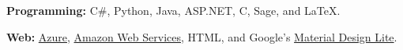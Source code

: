 \documentclass[11pt, letterpaper]{awesome-cv}
\begin{document}

\begin{cvparagraph}
\textbf{Programming:} C\#, Python, Java, ASP.NET, C, Sage, and \LaTeX.

\textbf{Web:} \href{https://azure.microsoft.com/}{Azure}, \href{https://aws.amazon.com/}{Amazon Web Services}, HTML, and Google's \href{https://getmdl.io/}{Material Design Lite}.
\end{cvparagraph}
\end{document}

